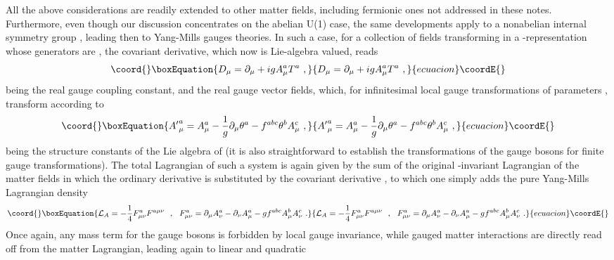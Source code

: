 \documentclass[a4paper,11pt]{article}
\begin{document}
All the above considerations are readily extended to other matter fields,
including fermionic ones not addressed in these notes. Furthermore,
even though our discussion concentrates on the abelian U(1) case,
the same de\-ve\-lop\-ments apply to a nonabelian internal symmetry group \coordHE{},
leading then to Yang-Mills gauges theories. In such a case, for a
collection of fields trans\-for\-ming in a \coordHE{}-representation whose generators
are \coordHE{}, the covariant derivative, which now is Lie-algebra valued, reads
\begin{equation}\coord{}\boxEquation{
D_\mu=\partial_\mu+igA^a_\mu T^a\ ,
}{
D_\mu=\partial_\mu+igA^a_\mu T^a\ ,
}{ecuacion}\coordE{}\end{equation}
\coordHE{} being the real gauge coupling constant, and \coordHE{} the real gauge
vector fields, which, for infinitesimal local gauge transformations of
parameters \coordHE{}, transform according to
\begin{equation}\coord{}\boxEquation{
{A'}^a_\mu=A^a_\mu-\frac{1}{g}\partial_\mu\theta^a-
f^{abc}\theta^bA^c_\mu\ ,
}{
{A'}^a_\mu=A^a_\mu-\frac{1}{g}\partial_\mu\theta^a-
f^{abc}\theta^bA^c_\mu\ ,
}{ecuacion}\coordE{}\end{equation}
\coordHE{} being the structure constants of the Lie algebra of \coordHE{}
(it is also straightforward to establish the transformations of the gauge
bosons for finite gauge transformations). 
The total Lagrangian of such a system is again given by the sum of the
original \coordHE{}-invariant Lagrangian of the matter fields in which the ordinary 
derivative is substituted by the covariant derivative \coordHE{}, to which one 
simply adds the pure Yang-Mills Lagrangian density
\begin{equation}\coord{}\boxEquation{
{\cal L}_A=-\frac{1}{4}F^a_{\mu\nu}F^{a\mu\nu}\ \ ,\ \ 
F^a_{\mu\nu}=\partial_\mu A^a_\nu-\partial_\nu A^a_\mu-
gf^{abc}A^b_\mu A^c_\nu\ .
}{
{\cal L}_A=-\frac{1}{4}F^a_{\mu\nu}F^{a\mu\nu}\ \ ,\ \ 
F^a_{\mu\nu}=\partial_\mu A^a_\nu-\partial_\nu A^a_\mu-
gf^{abc}A^b_\mu A^c_\nu\ .
}{ecuacion}\coordE{}\end{equation}
Once again, any mass term for the gauge bosons \coordHE{} is forbidden by
local gauge invariance, while gauged matter interactions are directly
read off from the matter Lagrangian, leading again to linear and quadratic
\end{document}
